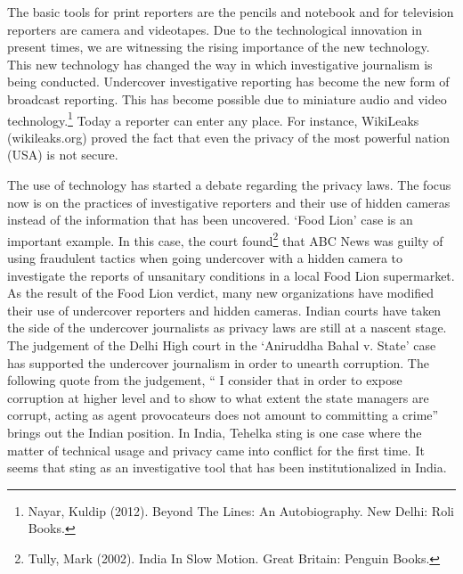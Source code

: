 \begin{multicols}{2}
\noi
The basic tools for print reporters are the pencils and notebook and for television reporters are
camera and videotapes. Due to the technological innovation in present times, we are witnessing
the rising importance of the new technology. This new technology has changed the way in
which investigative journalism is being conducted. Undercover investigative reporting has
become the new form of broadcast reporting. This has become possible due to miniature audio
and video technology.\footnote{Nayar, Kuldip (2012). Beyond The Lines: An Autobiography. New Delhi: Roli Books.} Today a reporter can enter any place. For instance, WikiLeaks
(wikileaks.org) proved the fact that even the privacy of the most powerful nation (USA) is not
secure.

\vspace{-.2cm}

\noi
The use of technology has started a debate regarding the privacy laws. The focus now is on the
practices of investigative reporters and their use of hidden cameras instead of the information
that has been uncovered. ‘Food Lion’ case is an important example. In this case, the court
found\footnote{Tully, Mark (2002). India In Slow Motion. Great Britain: Penguin Books.} that ABC News was guilty of using fraudulent tactics when going undercover with a
hidden camera to investigate the reports of unsanitary conditions in a local Food Lion
supermarket. As the result of the Food Lion verdict, many new organizations have modified
their use of undercover reporters and hidden cameras. Indian courts have taken the side of the
undercover journalists as privacy laws are still at a nascent stage. The judgement of the Delhi High court in the ‘Aniruddha Bahal v. State’ case has supported the undercover journalism in
order to unearth corruption. The following quote from the judgement, “ I consider that in order
to expose corruption at higher level and to show to what extent the state managers are corrupt,
acting as agent provocateurs does not amount to committing a crime” brings out the Indian
position. In India, Tehelka sting is one case where the matter of technical usage and privacy
came into conflict for the first time. It seems that sting as an investigative tool that has been
institutionalized in India.


\end{multicols}

